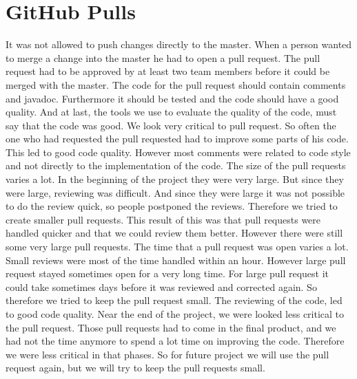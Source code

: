 \section{GitHub Pulls}
It was not allowed to push changes directly to the master. When a person wanted to merge a change into the master he had to open a pull request. The pull request had to be approved by at least two team members before it could be merged with the master. The code for the pull request should contain comments and javadoc. Furthermore it should be tested and the code should have a good quality. And at last, the tools we use to evaluate the quality of the code, must say that the code was good. We look very critical to pull request. So often the one who had requested the pull requested had to improve some parts of his code. This led to good code quality. However most comments were related to code style and not directly to the implementation of the code.
The size of the pull requests varies a lot. In the beginning of the project they were very large. But since they were large, reviewing was difficult. And since they were large it was not possible to do the review quick, so people postponed the reviews. Therefore we tried to create smaller pull requests. This result of this was that pull requests were handled quicker and that we could review them better. However there were still some very large pull requests.
The time that a pull request was open varies a lot. Small reviews were most of the time handled within an hour. However large pull request stayed sometimes open for a very long time. For large pull request it could take sometimes days before it was reviewed and corrected again. So therefore we tried to keep the pull request small. The reviewing of the code, led to good code quality. Near the end of the project, we were looked less critical to the pull request. Those pull requests had to come in the final product, and we had not the time anymore to spend a lot time on improving the code. Therefore we were less critical in that phases.
So for future project we will use the pull request again, but we will try to keep the pull requests small. 

